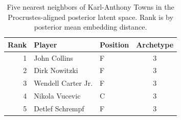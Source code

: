 \begin{table}[htbp]
  \centering\small
  \begin{tabular}{rllc}
    \toprule
    Rank & Player & Position & Archetype \\
    \midrule
    1 & John Collins & F & 3 \\
    2 & Dirk Nowitzki & F & 3 \\
    3 & Wendell Carter Jr. & F & 3 \\
    4 & Nikola Vucevic & C & 3 \\
    5 & Detlef Schrempf & F & 3 \\
    \bottomrule
  \end{tabular}
  \caption{Five nearest neighbors of Karl-Anthony Towns in the Procrustes-aligned posterior latent space. Rank is by posterior mean embedding distance.}
  \label{tab:Karl_Anthony_Towns_neighbors}
\end{table}

